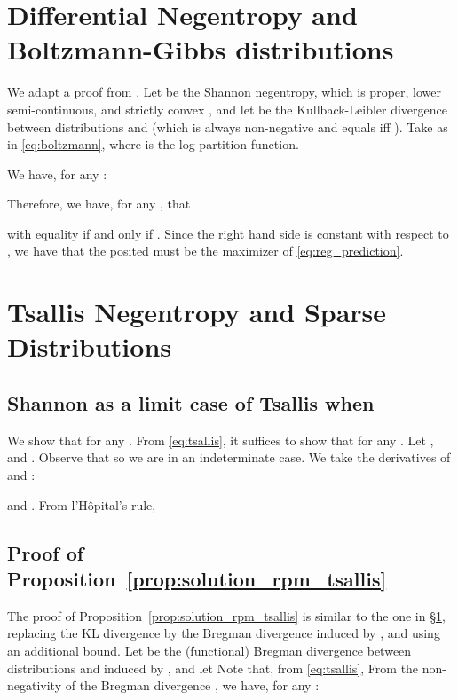 \documentclass{article}
\begin{document}
\section{Differential Negentropy and Boltzmann-Gibbs distributions}\label{sec:diff_ent_exp_family}

We adapt a proof from \citet{cover2012elements}.
Let  be the Shannon negentropy, which is proper, lower semi-continuous, and strictly convex \citep[example~9.41]{Bauschke_Combettes2011}, and let   be the Kullback-Leibler divergence between distributions  and  (which is always non-negative and equals  iff ).
Take  as in \eqref{eq:boltzmann}, where  is the log-partition function.

We have, for any :

Therefore, we have, for any  , that

with equality if and only if . Since the right hand side is constant with respect to , we have that the posited  must be the maximizer of \eqref{eq:reg_prediction}.





\section{Tsallis Negentropy and  Sparse Distributions}\label{sec:gini_ent_sparse_family}



\subsection{Shannon as a limit case of Tsallis when }

We show that  for any . 
From \eqref{eq:tsallis}, it suffices to show that  for any . 
Let , and
. Observe that 
so we are in an indeterminate case.
We take the derivatives of  and : 

and . 
From l'H\^{o}pital's rule,



\subsection{Proof of Proposition~\ref{prop:solution_rpm_tsallis}}

The proof of Proposition~\ref{prop:solution_rpm_tsallis} is  similar to the one in \S\ref{sec:diff_ent_exp_family}, replacing the KL divergence by the Bregman divergence induced by , and using an additional bound.
Let  be the (functional) Bregman divergence between distributions  and  induced by , and let  
Note that, from \eqref{eq:tsallis},  
From the non-negativity of the Bregman divergence \cite{bregman1967relaxation}, we have, for any :
\end{document}
